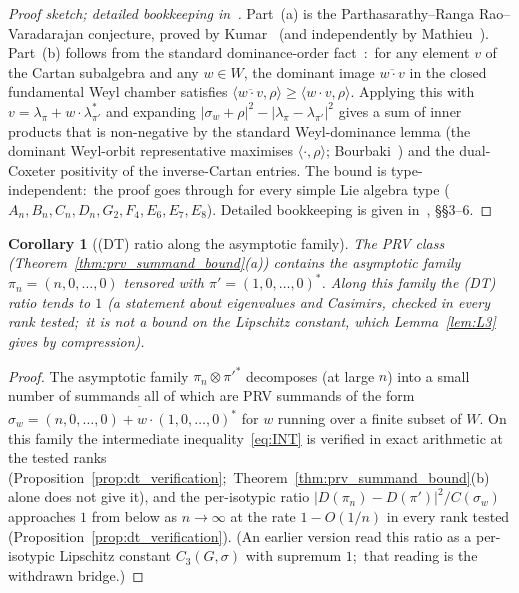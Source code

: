 \documentclass[11pt,a4paper]{article}
\theoremstyle{plain}
\newtheorem{corollary}[theorem]{Corollary}
\theoremstyle{definition}
\newcommand{\Cas}{C}
\newcommand{\Dop}{D}
\begin{document}
\begin{proof}[Proof sketch; detailed bookkeeping
in~\cite{dirac_triangle_memo}]
Part~(a) is the
Parthasarathy--Ranga Rao--Varadarajan conjecture, proved by
Kumar~\cite{kumar1988} (and independently by
Mathieu~\cite{mathieu1989}). Part~(b) follows from the standard
dominance-order fact~\cite[\S13]{humphreys1972}:\ for
any element $v$ of the Cartan subalgebra and any
$w \in W$, the dominant image $\overline{w \cdot v}$ in the closed
fundamental Weyl chamber satisfies $\langle \overline{w \cdot v},
\rho\rangle \ge \langle w \cdot v, \rho\rangle$. Applying this with
$v = \lambda_\pi + w \cdot \lambda_{\pi'}^*$ and expanding
$|\sigma_w + \rho|^2 - |\lambda_\pi - \lambda_{\pi'}|^2$ gives a sum
of inner products that is non-negative by the standard Weyl-dominance
lemma (the dominant Weyl-orbit representative maximises
$\langle\cdot,\rho\rangle$; Bourbaki~\cite{bourbaki_lie_8}) and the
dual-Coxeter positivity of the inverse-Cartan entries. The bound is
type-independent:\ the proof goes through for every simple Lie algebra
type ($A_n, B_n, C_n, D_n, G_2, F_4, E_6, E_7, E_8$). Detailed
bookkeeping is given in~\cite{dirac_triangle_memo}, \S\S 3--6.
\end{proof}

\begin{corollary}[(DT) ratio along the asymptotic family]
\label{cor:c3_asymptotic_tight}
The PRV class (Theorem~\ref{thm:prv_summand_bound}(a))
contains the asymptotic family $\pi_n = (n, 0, \ldots, 0)$ tensored
with $\pi' = (1, 0, \ldots, 0)^*$. Along this family the (DT) ratio tends to
$1$ (a statement about eigenvalues and Casimirs, checked in every rank
tested;\ it is not a bound on the Lipschitz constant, which
Lemma~\ref{lem:L3} gives by compression).
\end{corollary}

\begin{proof}
The asymptotic family $\pi_n \otimes \pi'^*$ decomposes (at large $n$)
into a small number of summands all of which are PRV summands of the
form $\sigma_w = \overline{(n, 0, \ldots, 0) + w \cdot
(1, 0, \ldots, 0)^*}$ for $w$ running over a finite subset of $W$. On
this family the intermediate inequality~\eqref{eq:INT} is verified in exact
arithmetic at the tested ranks (Proposition~\ref{prop:dt_verification};\
Theorem~\ref{thm:prv_summand_bound}(b) alone does not give it), and the
per-isotypic ratio
$|\Dop(\pi_n) - \Dop(\pi')|^2 / \Cas(\sigma_w)$ approaches $1$ from
below as $n \to \infty$ at the rate $1 - O(1/n)$ in every rank tested
(Proposition~\ref{prop:dt_verification}).  (An earlier version read this
ratio as a per-isotypic Lipschitz constant $C_3(G, \sigma)$ with
supremum $1$;\ that reading is the withdrawn bridge.)
\end{proof}
\end{document}
